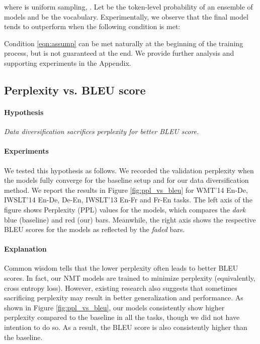 \documentclass{article}
\begin{document}
where  is uniform sampling, . Let  be the token-level probability of an ensemble of models  and  be the vocabulary. Experimentally, we observe that the final model  tends to outperform when the following condition is met:
\vspace{-0.5em}

Condition \ref{eqn:assump} can be met naturally at the beginning of the training process, but is not guaranteed at the end. We provide further analysis and supporting experiments in the Appendix.
 





\subsection{Perplexity vs. BLEU score} 

\paragraph{Hypothesis} \emph{Data diversification sacrifices perplexity for better BLEU score.
}

\vspace{-0.5em}
\paragraph{Experiments}

We tested this hypothesis as follows. We recorded the validation perplexity when the models fully converge for the baseline setup and for our data diversification method. We report the results  in Figure \ref{fig:ppl_vs_bleu} for WMT'14 En-De, IWSLT'14 En-De, De-En, IWSLT'13 En-Fr and Fr-En tasks. The left axis of the figure shows Perplexity (PPL) values for the models, which compares the \emph{dark} blue (baseline) and red (our) bars. Meanwhile, the right axis shows the respective BLEU scores for the models as reflected by the \emph{faded} bars.

\vspace{-0.5em}
\paragraph{Explanation}
Common wisdom tells that the lower perplexity often leads to better BLEU scores. In fact, our NMT models are trained to minimize perplexity (equivalently, cross entropy loss). However, existing research \citep{decoding_nmt} also suggests that sometimes sacrificing perplexity may result in better generalization and performance. As shown in Figure \ref{fig:ppl_vs_bleu}, our models consistently show higher perplexity compared to the baseline in all the tasks, though we did not have intention to do so. As a result, the BLEU score is also consistently higher than the baseline.
\end{document}
